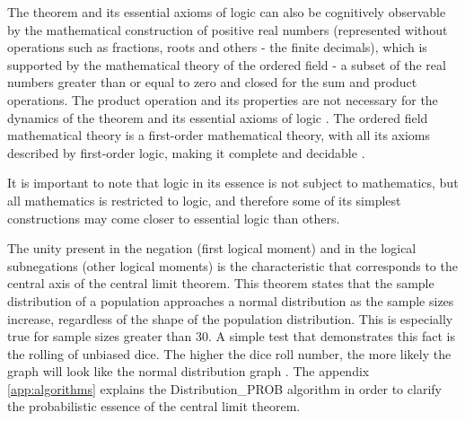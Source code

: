 The theorem and its essential axioms of logic can also be cognitively observable by the mathematical construction of positive real numbers (represented without operations such as fractions, roots and others - the finite decimals), which is supported by the mathematical theory of the ordered field - a subset of the real numbers greater than or equal to zero and closed for the sum and product operations. The product operation and its properties are not necessary for the dynamics of the theorem and its essential axioms of logic \cite{wiki_ordered_field}. The ordered field mathematical theory is a first-order mathematical theory, with all its axioms described by first-order logic, making it complete and decidable \cite{wiki_RealClosedField}.

It is important to note that logic in its essence is not subject to mathematics, but all mathematics is restricted to logic, and therefore some of its simplest constructions may come closer to essential logic than others.

The unity present in the negation (first logical moment) and in the logical subnegations (other logical moments) is the characteristic that corresponds to the central axis of the central limit theorem. This theorem states that the sample distribution of a population approaches a normal distribution as the sample sizes increase, regardless of the shape of the population distribution. This is especially true for sample sizes greater than 30. A simple test that demonstrates this fact is the rolling of unbiased dice. The higher the dice roll number, the more likely the graph will look like the normal distribution graph \cite{statisticshowto_central_limit_theorem}. The appendix \ref{app:algorithms} explains the Distribution\_PROB algorithm in order to clarify the probabilistic essence of the central limit theorem.

